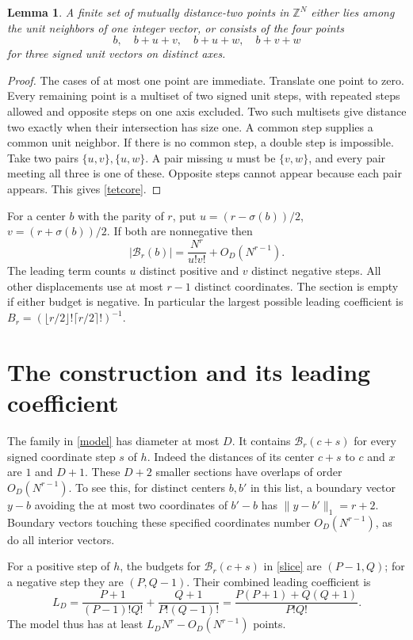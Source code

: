 \documentclass[10pt]{article}
\newtheorem{lemma}[theorem]{Lemma}
\newcommand{\Z}{\mathbb Z}
\newcommand{\s}{\sigma}
\newcommand{\B}{\mathcal B}
\newcommand{\norm}[1]{\lVert #1\rVert_1}
\begin{document}
\begin{lemma}\label{shape}
A finite set of mutually distance-two points in $\Z^N$ either lies among the unit neighbors of one integer vector, or consists of the four points
\[
 b,\quad b+u+v,\quad b+u+w,\quad b+v+w
 \tag{4}\label{tetcore}
\]
for three signed unit vectors on distinct axes.
\end{lemma}
\begin{proof}
The cases of at most one point are immediate. Translate one point to zero. Every remaining point is a multiset of two signed unit steps, with repeated steps allowed and opposite steps on one axis excluded. Two such multisets give distance two exactly when their intersection has size one. A common step supplies a common unit neighbor. If there is no common step, a double step is impossible. Take two pairs $\{u,v\},\{u,w\}$. A pair missing $u$ must be $\{v,w\}$, and every pair meeting all three is one of these. Opposite steps cannot appear because each pair appears. This gives \eqref{tetcore}.
\end{proof}

For a center $b$ with the parity of $r$, put $u=(r-\s(b))/2$, $v=(r+\s(b))/2$. If both are nonnegative then
\[
  |\B_r(b)|=\frac{N^r}{u!v!}+O_D(N^{r-1}).
  \tag{5}\label{slice}
\]
The leading term counts $u$ distinct positive and $v$ distinct negative steps. All other displacements use at most $r-1$ distinct coordinates. The section is empty if either budget is negative. In particular the largest possible leading coefficient is
$B_r=(\lfloor r/2\rfloor!\lceil r/2\rceil!)^{-1}$.

\section{The construction and its leading coefficient}

The family in \eqref{model} has diameter at most $D$. It contains $\B_r(c+s)$ for every signed coordinate step $s$ of $h$. Indeed the distances of its center $c+s$ to $c$ and $x$ are $1$ and $D+1$. These $D+2$ smaller sections have overlaps of order $O_D(N^{r-1})$. To see this, for distinct centers $b,b'$ in this list, a boundary vector $y-b$ avoiding the at most two coordinates of $b'-b$ has $\norm{y-b'}=r+2$. Boundary vectors touching these specified coordinates number $O_D(N^{r-1})$, as do all interior vectors.

For a positive step of $h$, the budgets for $\B_r(c+s)$ in \eqref{slice} are $(P-1,Q)$; for a negative step they are $(P,Q-1)$. Their combined leading coefficient is
\[
 L_D=\frac{P+1}{(P-1)!Q!}+\frac{Q+1}{P!(Q-1)!}
     =\frac{P(P+1)+Q(Q+1)}{P!Q!}.
 \tag{6}\label{ld}
\]
The model thus has at least $L_D N^r-O_D(N^{r-1})$ points.
\end{document}
